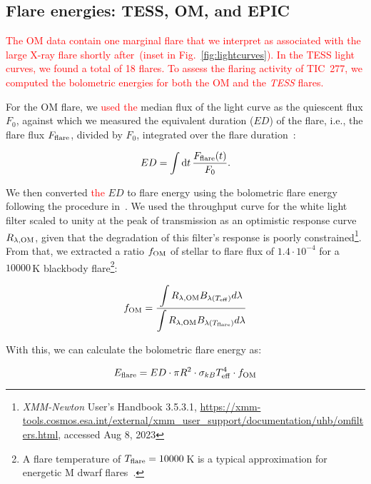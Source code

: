 \documentclass[twocolumn]{aastex631}
\begin{document}
\subsection{Flare energies: TESS, OM, and EPIC}
\label{sec:methods:flareenergies}
\textcolor{red}{The OM data contain one marginal flare that we interpret as associated with the large X-ray flare shortly after~(inset in Fig.~\ref{fig:lightcurves}). In the TESS light curves, we found a total of 18 flares. To assess the flaring activity of TIC~277, we computed the bolometric energies for both the OM and the \textit{TESS} flares.} 

For the OM flare, we \textcolor{red}{used the} median flux of the light curve as the quiescent flux $F_0$, against which we measured the equivalent duration ($ED$) of the flare, i.e., the flare flux $F_{\rm flare}$, divided by $F_0$, integrated over the flare duration~\citep{gershberg1972results}:

\begin{equation}
\label{eq:ED}
ED=\displaystyle \int \mathrm dt\, \frac{F_{\rm flare}(t)}{F_0}.
\end{equation}

We then converted \textcolor{red}{the} $ED$ to flare energy using the bolometric flare energy following the procedure in~\citet{shibayama2013superflares}. We used the throughput curve for the white light filter scaled to unity at the peak of transmission as an optimistic response curve $R_{\lambda, \rm OM}$, given that the degradation of this filter's response is poorly constrained\footnote{\textit{XMM-Newton} User's Handbook 3.5.3.1, \url{https://xmm-tools.cosmos.esa.int/external/xmm_user_support/documentation/uhb/omfilters.html}, accessed Aug 8, 2023}. From that, we extracted a ratio $f_{\rm OM}$ of stellar to flare flux of $1.4\cdot 10^{-4}$ for a $10000\,$K blackbody flare\footnote{A flare temperature of $T_{\rm flare}=10000\,$K is a typical approximation for energetic M dwarf flares~\citep{kowalski2013timeresolved, howard2020evryflarea}.}:

\begin{equation}
    f_{\rm OM} = \frac{\displaystyle\int R_{\lambda, \rm OM} B_{\lambda(T_{\rm eff})}  d\lambda}{\displaystyle\int R_{\lambda, \rm OM} B_{\lambda(T_{\rm flare})} d\lambda} 
    \label{eq:ratio}
\end{equation}

With this, we can calculate the bolometric flare energy as:

\begin{equation}
    E_{\rm flare} = ED \cdot \pi R^2 \cdot \sigma_{kB} T_{\rm eff}^4 \cdot f_{\rm OM}
    \label{eq:eflare}
\end{equation}
\end{document}

